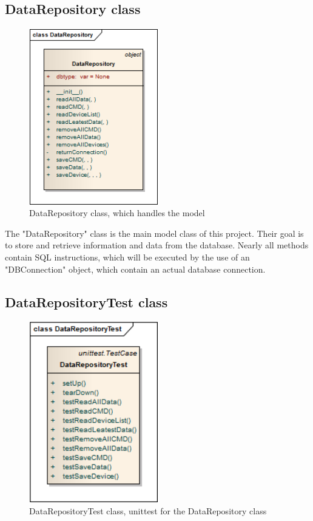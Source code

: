 \subsection{DataRepository class}
\begin{figure}[H]
   \centering
   \includegraphics[width=0.5\textwidth]{pic/DataRepository.png}%
   \caption{DataRepository class, which handles the model}
   \label{DataRepositorypic}%
\end{figure}

The "DataRepository" class is the main model class of this project. Their goal is to store and retrieve information and data from the database. Nearly all methods contain SQL instructions, which will be executed by the use of an "DBConnection" object, which contain an actual database connection.

\newpage
\subsection{DataRepositoryTest class}
\begin{figure}[H]
   \centering
   \includegraphics[width=0.5\textwidth]{pic/DataRepositoryTest.png}%
   \caption{DataRepositoryTest class, unittest for the DataRepository class}
   \label{DataRepositoryTestpic}%
\end{figure}

